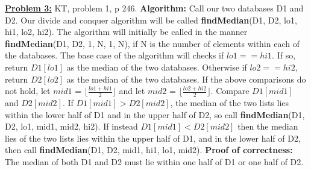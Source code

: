 \documentclass[11pt]{article}
\begin{document}
\begin{flushleft}
		\newpage
		\item \textbf {\underline{Problem 3:}} KT, problem 1, p 246.
		\newline
		\textbf{Algorithm:} Call our two databases D1 and D2. Our divide and conquer algorithm will be called \textbf{findMedian}(D1, D2, lo1, hi1, lo2, hi2). The algorithm will initially be called in the manner \textbf{findMedian}(D1, D2, 1, N, 1, N), if N is the number of elements within each of the databases. The base case of the algorithm will checks if $lo1 == hi1$. If so, return $D1[lo1]$ as the median of the two databases. Otherwise if $lo2 == hi2$, return $D2[lo2]$ as the median of the two databases. 
		\newline
		If the above comparisons do not hold, let $mid1$ = $\lfloor \frac{lo1 + hi1}{2} \rfloor$
		and let $mid2$ = $\lfloor \frac{lo2 + hi2}{2} \rfloor$. Compare $D1[mid1]$ and $D2[mid2]$. If $D1[mid1] > D2[mid2]$, the median of the two lists lies within the lower half of D1 and in the upper half of D2, so call 
		\textbf{findMedian}(D1, D2, lo1, mid1, mid2, hi2).
		\newline
		If instead $D1[mid1] < D2[mid2]$ then the median lies of the two lists lies within the upper half of D1, and in the lower half of D2, then call \textbf{findMedian}(D1, D2, mid1, hi1, lo1, mid2). 
		\newline
		\newline
		\textbf{Proof of correctness:} The median of both D1 and D2 must lie within one half of D1 or one half of D2. 
	\end{flushleft}
\end{document}
